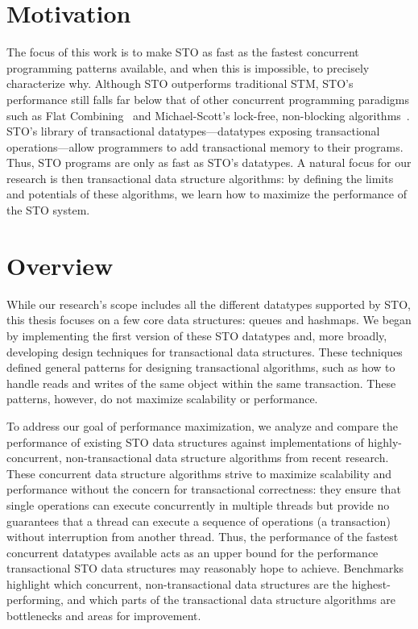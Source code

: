 \section{Motivation}
The focus of this work is to make STO as fast as the fastest concurrent programming patterns available, and when this is impossible, to precisely characterize why. Although STO outperforms traditional STM, STO’s performance still falls far below that of other concurrent programming paradigms such as Flat Combining~\cite{flatcombining} and Michael-Scott's lock-free, non-blocking algorithms~\cite{queue1}. STO’s library of transactional datatypes---datatypes exposing transactional operations---allow programmers to add transactional memory to their programs. Thus, STO programs are only as fast as STO's datatypes. A natural focus for our research is then transactional data structure algorithms: by defining the limits and potentials of these algorithms, we learn how to maximize the performance of the STO system.

\section{Overview}
While our research's scope includes all the different datatypes supported by STO, this thesis focuses on a few core data structures: queues and hashmaps. We began by implementing the first version of these STO datatypes and, more broadly, developing design techniques for transactional data structures. These techniques defined general patterns for designing transactional algorithms, such as how to handle reads and writes of the same object within the same transaction. These patterns, however, do not maximize scalability or performance.

To address our goal of performance maximization, we analyze and compare the performance of existing STO data structures against implementations of highly-concurrent, non-transactional data structure algorithms from recent research. These concurrent data structure algorithms strive to maximize scalability and performance without the concern for transactional correctness: they ensure that single operations can execute concurrently in multiple threads but provide no guarantees that a thread can execute a sequence of operations (a transaction) without interruption from another thread.
Thus, the performance of the fastest concurrent datatypes available acts as an upper bound for the performance transactional STO data structures may reasonably hope to achieve. Benchmarks highlight which concurrent, non-transactional data structures are the highest-performing, and which parts of the transactional data structure algorithms are bottlenecks and areas for improvement. 


